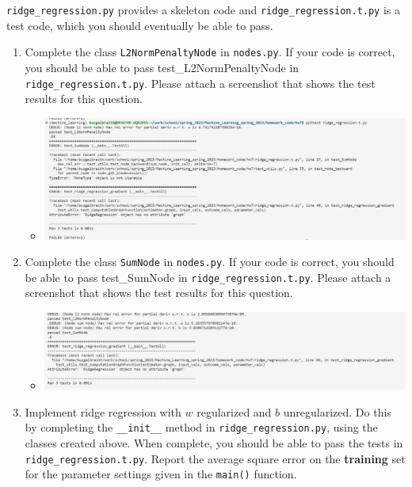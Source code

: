 \documentclass{article}
\theoremstyle{plain}
\theoremstyle{definition}
\begin{document}
\texttt{ridge\_regression.py} provides a skeleton code
and \texttt{ridge\_regression.t.py} is a test code, which you should
eventually be able to pass.
\begin{enumerate}
\setcounter{enumi}{\value{saveenum}}
\item Complete the class \texttt{L2NormPenaltyNode} in \texttt{nodes.py}. If your code is correct, you should be able to pass test\_L2NormPenaltyNode in \texttt{ridge\_regression.t.py}. Please attach a screenshot that shows the test results for this question.
\begin{itemize}
    \color{blue}
    \item \includegraphics[width = 15cm]{homework_code/hw7/immages/hw_7_1.JPG}
\end{itemize}
\item Complete the class \texttt{SumNode} in \texttt{nodes.py}. If your code is correct, you should be able to pass test\_SumNode in \texttt{ridge\_regression.t.py}. Please attach a screenshot that shows the test results for this question.
\begin{itemize}
    \color{blue}
    \item \includegraphics[width = 15cm]{homework_code/hw7/immages/hw_7_2.JPG}
\end{itemize}
\item Implement ridge regression with $w$ regularized and $b$ unregularized.
Do this by completing the \texttt{\_\_init\_\_} method in \texttt{ridge\_regression.py},
using the classes created above. When complete, you should be able
to pass the tests in \texttt{ridge\_regression.t.py}. Report the average
    square error on the \textbf{training} set for the parameter settings
given in the \texttt{main()} function. 
\begin{itemize}

\end{itemize}
\end{enumerate}
\end{document}
